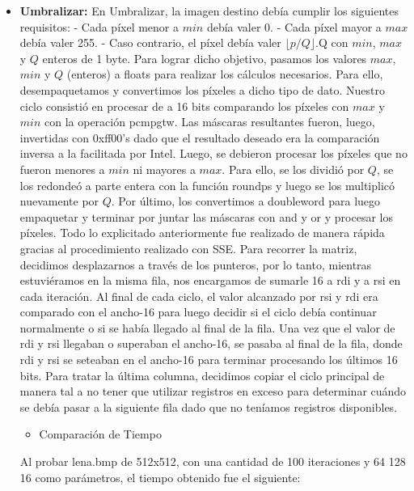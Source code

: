 \documentclass[10pt, a4paper]{article}
\begin{document}
\begin{itemize}
\item {\textbf{Umbralizar:}}
En Umbralizar, la imagen destino debía cumplir los siguientes requisitos:\newline
- Cada píxel menor a $min$ debía valer 0.\newline
- Cada píxel mayor a $max$ debía valer 255.\newline
- Caso contrario, el píxel debía valer $\lfloor p/Q \rfloor$.Q\newline
con $min$, $max$ y $Q$ enteros de 1 byte.\newline
\newline
Para lograr dicho objetivo, pasamos los valores $max$, $min$ y $Q$ (enteros) a floats para realizar los cálculos necesarios. Para ello, desempaquetamos y convertimos los píxeles a dicho tipo de dato.\newline
Nuestro ciclo consistió en procesar de a 16 bits comparando los píxeles con $max$ y $min$ con la operación pcmpgtw. Las máscaras resultantes fueron, luego, invertidas con 0xff00's dado que el resultado deseado era la comparación inversa a la facilitada por Intel. Luego, se debieron procesar los píxeles que no fueron menores a $min$ ni mayores a $max$. Para ello, se los dividió por $Q$, se los redondeó a parte entera con la función roundps y luego se los multiplicó nuevamente por $Q$. Por último, los convertimos a doubleword para luego empaquetar y terminar por juntar las máscaras con and y or y procesar los píxeles. Todo lo explicitado anteriormente fue realizado de manera rápida gracias al procedimiento realizado con SSE.\newline
Para recorrer la matriz, decidimos desplazarnos a través de los punteros, por lo tanto, mientras estuviéramos en la misma fila, nos encargamos de sumarle 16 a rdi y a rsi en cada iteración. Al final de cada ciclo, el valor alcanzado por rsi y rdi era comparado con el ancho-16 para luego decidir si el ciclo debía continuar normalmente o si se había llegado al final de la fila. Una vez que el valor de rdi y rsi llegaban o superaban el ancho-16, se pasaba al final de la fila, donde rdi y rsi se seteaban en el ancho-16 para terminar procesando los últimos 16 bits. Para tratar la última columna, decidimos copiar el ciclo principal de manera tal a no tener que utilizar registros en exceso para determinar cuándo se debía pasar a la siguiente fila dado que no teníamos registros disponibles.\newline
\begin{itemize}
\item{Comparación de Tiempo}
\end{itemize}
Al probar lena.bmp de 512x512, con una cantidad de 100 iteraciones y 64 128 16 como parámetros, el tiempo obtenido fue el siguiente: \newline


\end{itemize}
\end{document}
